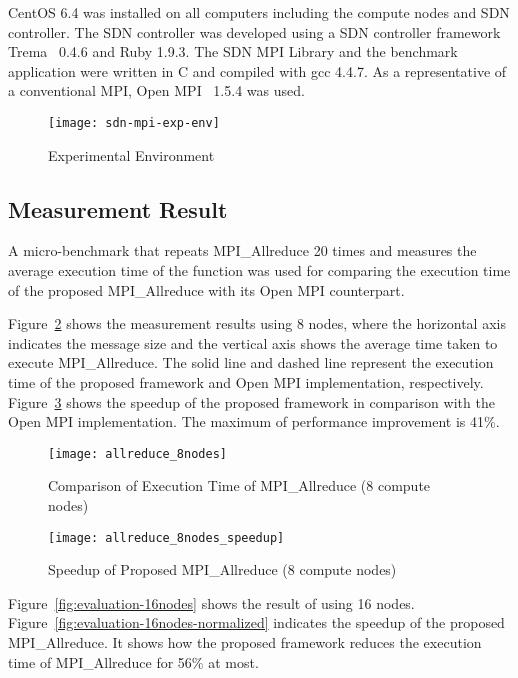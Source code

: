 CentOS 6.4 was installed on all computers including the compute nodes and
SDN controller. The SDN controller was developed using a SDN controller
framework Trema~\autocite{trema} 0.4.6 and Ruby 1.9.3. The SDN
MPI Library and the benchmark application were written in C and
compiled with gcc 4.4.7. As a representative of a conventional MPI,
Open MPI~\autocite{Gabriel2004} 1.5.4 was used.

\begin{figure}
    \centering
    \texttt{[image: sdn-mpi-exp-env]}
    \caption{Experimental Environment}%
    \label{fig:experiment-environment}
\end{figure}

\subsection{Measurement Result}

A micro-benchmark that repeats MPI\_Allreduce 20
times and measures the average execution time of the function was used
for comparing the execution time of the proposed MPI\_Allreduce
with its Open MPI counterpart.

Figure~\ref{fig:evaluation-8nodes} shows the measurement results using 8
nodes, where the horizontal axis indicates the message size and the
vertical axis shows the average time taken to execute
MPI\_Allreduce. The solid line and dashed line represent the
execution time of the proposed framework and Open MPI implementation,
respectively. Figure~\ref{fig:evaluation-8nodes-normalized} shows the
speedup of the proposed framework in comparison with the Open MPI
implementation. The maximum of performance improvement is 41\%.

\begin{figure}
    \centering
    \texttt{[image: allreduce\_8nodes]}
    \caption{Comparison of Execution Time of MPI\_Allreduce (8 compute nodes)}%
    \label{fig:evaluation-8nodes}
\end{figure}

\begin{figure}
    \centering
    \texttt{[image: allreduce\_8nodes\_speedup]}
    \caption{Speedup of Proposed MPI\_Allreduce (8 compute nodes)}%
    \label{fig:evaluation-8nodes-normalized}
\end{figure}

Figure~\ref{fig:evaluation-16nodes} shows the result of using 16 nodes.
Figure~\ref{fig:evaluation-16nodes-normalized} indicates the speedup of the
proposed MPI\_Allreduce. It shows how the proposed framework reduces the
execution time of MPI\_Allreduce for 56\% at most.

